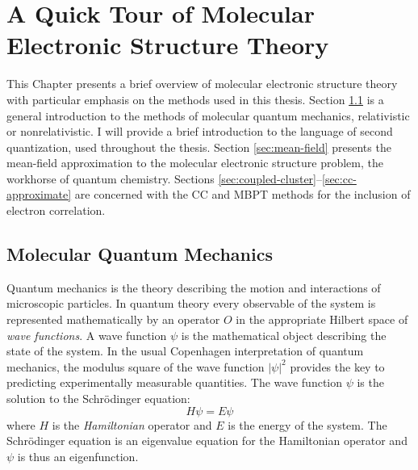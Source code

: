 
\renewcommand{\thefigure}{\arabic{chapter}.\arabic{figure}}

\chapter{A Quick Tour of Molecular Electronic Structure Theory}\label{ch:QM}

\begin{epigraphs}
\setlength\epigraphwidth{7.5cm}
\setlength\epigraphwidth{7cm}
\end{epigraphs}

This Chapter presents a brief overview of molecular electronic structure
theory with particular emphasis on the methods used in this thesis.
Section \ref{sec:mqm} is a general introduction to the methods of
molecular quantum mechanics, relativistic or nonrelativistic.
I will provide a brief introduction to the language of second
quantization, used throughout the thesis.
Section \ref{sec:mean-field} presents the mean-field approximation to
the molecular electronic structure problem, the workhorse of quantum
chemistry.
Sections \ref{sec:coupled-cluster}--\ref{sec:cc-approximate} are
concerned with the \gls{CC} and \gls{MBPT} methods for the inclusion of
electron correlation.

\section{Molecular Quantum Mechanics}\label{sec:mqm}

Quantum mechanics is the theory describing the motion and interactions
of microscopic particles. In quantum theory every observable of the
system is represented mathematically by an operator $O$ in the
appropriate Hilbert space of \emph{wave functions}.
A wave function $\psi$ is the mathematical object describing the state of the
system. In the usual Copenhagen interpretation of quantum mechanics, the
modulus square of the wave function $|\psi|^2$ provides the key to
predicting experimentally measurable quantities.\autocite{Konishi2009-zb}
The wave function $\psi$ is the solution to the Schr\"{o}dinger equation:
\begin{equation}\label{eq:schrodinger}
  H\psi = E\psi
\end{equation}
where $H$ is the \emph{Hamiltonian} operator and $E$ is the energy of
the system. The Schr\"{o}dinger equation is an eigenvalue equation for
the Hamiltonian operator and $\psi$ is thus an
eigenfunction.\autocite{Arfken2013-pt}

